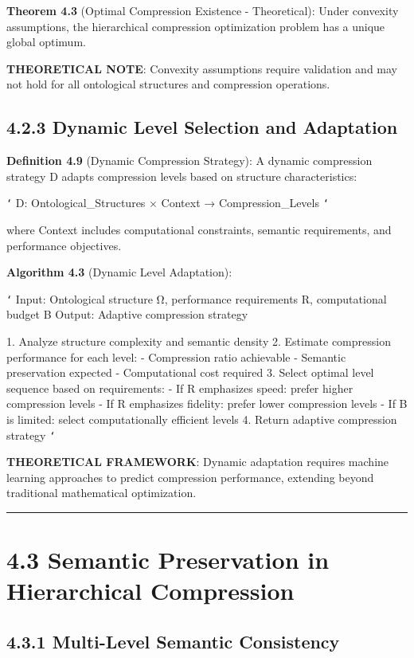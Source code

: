 \textbf{Theorem 4.3} (Optimal Compression Existence - Theoretical): Under convexity assumptions, the hierarchical compression optimization problem has a unique global optimum.

\textbf{THEORETICAL NOTE}: Convexity assumptions require validation and may not hold for all ontological structures and compression operations.

\subsection{4.2.3 Dynamic Level Selection and Adaptation}

\textbf{Definition 4.9} (Dynamic Compression Strategy): A dynamic compression strategy D adapts compression levels based on structure characteristics:

\texttt{`}
D: Ontological_Structures × Context → Compression_Levels
\texttt{`}

where Context includes computational constraints, semantic requirements, and performance objectives.

\textbf{Algorithm 4.3} (Dynamic Level Adaptation):

\texttt{`}
Input: Ontological structure Ω, performance requirements R, computational budget B
Output: Adaptive compression strategy

1. Analyze structure complexity and semantic density
2. Estimate compression performance for each level:
   - Compression ratio achievable
   - Semantic preservation expected
   - Computational cost required
3. Select optimal level sequence based on requirements:
   - If R emphasizes speed: prefer higher compression levels
   - If R emphasizes fidelity: prefer lower compression levels
   - If B is limited: select computationally efficient levels
4. Return adaptive compression strategy
\texttt{`}

\textbf{THEORETICAL FRAMEWORK}: Dynamic adaptation requires machine learning approaches to predict compression performance, extending beyond traditional mathematical optimization.

\hrule

\section{4.3 Semantic Preservation in Hierarchical Compression}

\subsection{4.3.1 Multi-Level Semantic Consistency}

